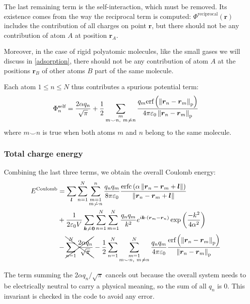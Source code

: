 \documentclass[main.tex]{subfiles}
\begin{document}
The last remaining term is the self-interaction, which must be removed. Its existence comes from the way the reciprocal term is computed: $\Phi^\text{reciprocal}(\boldsymbol r)$ includes the contribution of all charges on point $\boldsymbol r$, but there should not be any contribution of atom $A$ at position $\boldsymbol r_A$.

Moreover, in the case of rigid polyatomic molecules, like the small gases we will discuss in \cref{adsorption}, there should not be any contribution of atom $A$ at the positions $\boldsymbol r_B$ of other atoms $B$ part of the same molecule.

Each atom $1\le n\le N$ thus contributes a spurious potential term:
\[\Phi^\text{self}_n = \frac{2\alpha q_n}{\sqrt\pi} + \frac12\sum_{\substack{m\\m\smile n,\ m\not\kern0.2ex= n}}\frac{q_m\text{erf}\left(\left\|\boldsymbol r_n - \boldsymbol r_m\right\|_\text{p}\right)}{4\pi\varepsilon_0\left\|\boldsymbol r_n - \boldsymbol r_m\right\|_\text{p}}\]
where $m\smile n$ is true when both atoms $m$ and $n$ belong to the same molecule.

\subsubsection{Total charge energy}

Combining the last three terms, we obtain the overall Coulomb energy:
\[\begin{split}
E^\text{Coulomb} &= \sum_{\boldsymbol l} \sum_{n=1}^N\sum_{\substack{m=1\\m\not\smile n}}^n \frac{q_n q_m}{8\pi\varepsilon_0}\frac{\text{erfc}\left(\alpha\left\|\boldsymbol r_n - \boldsymbol r_m + \boldsymbol l\right\|\right)}{\left\|\boldsymbol r_n - \boldsymbol r_m + \boldsymbol l\right\|}
\\&+ \frac1{2\varepsilon_0V} \sum_{\boldsymbol{k}\not\kern0.2ex=\boldsymbol{0}}\sum_{n=1}^N\sum_{m=1}^N \frac{q_n q_m}{k^2}e^{i\boldsymbol k\cdot\left(\boldsymbol r_m - \boldsymbol r_n\right)}\exp\left(\frac{-k^2}{4\alpha^2}\right)
\\&- \xcancel{\sum_{n=1}^N\frac{2\alpha q_n}{\sqrt\pi}}
- \frac12\sum_{n=1}^N\sum_{\substack{m=1\\m\smile n,\ m\not\kern0.2ex= n}}^N \frac{q_n q_m}{4\pi\varepsilon_0}\frac{\text{erf}\left(\left\|\boldsymbol r_n - \boldsymbol r_m\right\|_\text{p}\right)}{\left\|\boldsymbol r_n - \boldsymbol r_m\right\|_\text{p}}
\label{eq:totalcoulombenergy}\end{split}\]

The term summing the $2\alpha q_n/\sqrt\pi$ cancels out because the overall system needs to be electrically neutral to carry a physical meaning, so the sum of all $q_n$ is 0. This invariant is checked in the code to avoid any error.
\end{document}
